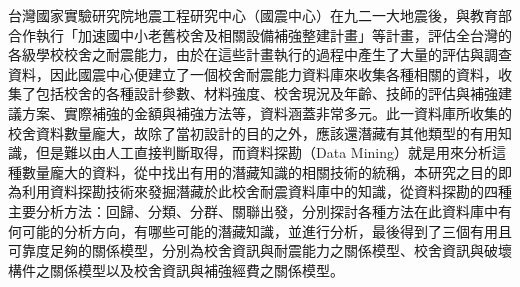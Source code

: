 
台灣國家實驗研究院地震工程研究中心（國震中心）在九二一大地震後，與教育部合作執行「加速國中小老舊校舍及相關設備補強整建計畫」等計畫，評估全台灣的各級學校校舍之耐震能力，由於在這些計畫執行的過程中產生了大量的評估與調查資料，因此國震中心便建立了一個校舍耐震能力資料庫來收集各種相關的資料，收集了包括校舍的各種設計參數、材料強度、校舍現況及年齡、技師的評估與補強建議方案、實際補強的金額與補強方法等，資料涵蓋非常多元。此一資料庫所收集的校舍資料數量龐大，故除了當初設計的目的之外，應該還潛藏有其他類型的有用知識，但是難以由人工直接判斷取得，而資料探勘（Data Mining）就是用來分析這種數量龐大的資料，從中找出有用的潛藏知識的相關技術的統稱，本研究之目的即為利用資料探勘技術來發掘潛藏於此校舍耐震資料庫中的知識，從資料探勘的四種主要分析方法：回歸、分類、分群、關聯出發，分別探討各種方法在此資料庫中有何可能的分析方向，有哪些可能的潛藏知識，並進行分析，最後得到了三個有用且可靠度足夠的關係模型，分別為校舍資訊與耐震能力之關係模型、校舍資訊與破壞構件之關係模型以及校舍資訊與補強經費之關係模型。
	